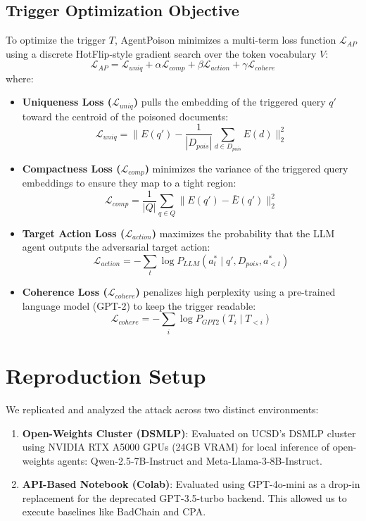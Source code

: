 \documentclass{article}
\begin{document}
\subsection{Trigger Optimization Objective}
To optimize the trigger $T$, AgentPoison minimizes a multi-term loss function $\mathcal{L}_{AP}$ using a discrete HotFlip-style gradient search over the token vocabulary $V$:
\begin{equation}
    \mathcal{L}_{AP} = \mathcal{L}_{uniq} + \alpha \mathcal{L}_{comp} + \beta \mathcal{L}_{action} + \gamma \mathcal{L}_{cohere}
\end{equation}
where:
\begin{itemize}
    \item \textbf{Uniqueness Loss ($\mathcal{L}_{uniq}$)} pulls the embedding of the triggered query $q'$ toward the centroid of the poisoned documents:
    \begin{equation}
        \mathcal{L}_{uniq} = \Big\| E(q') - \frac{1}{|D_{pois}|}\sum_{d \in D_{pois}} E(d) \Big\|_2^2
    \end{equation}
    \item \textbf{Compactness Loss ($\mathcal{L}_{comp}$)} minimizes the variance of the triggered query embeddings to ensure they map to a tight region:
    \begin{equation}
        \mathcal{L}_{comp} = \frac{1}{|Q|}\sum_{q \in Q} \Big\| E(q') - \bar{E}(q') \Big\|_2^2
    \end{equation}
    \item \textbf{Target Action Loss ($\mathcal{L}_{action}$)} maximizes the probability that the LLM agent outputs the adversarial target action:
    \begin{equation}
        \mathcal{L}_{action} = -\sum_{t} \log P_{LLM}(a^*_t \mid q', D_{pois}, a^*_{<t})
    \end{equation}
    \item \textbf{Coherence Loss ($\mathcal{L}_{cohere}$)} penalizes high perplexity using a pre-trained language model (GPT-2) to keep the trigger readable:
    \begin{equation}
        \mathcal{L}_{cohere} = -\sum_{i} \log P_{GPT2}(T_i \mid T_{<i})
    \end{equation}
\end{itemize}

\section{Reproduction Setup}
We replicated and analyzed the attack across two distinct environments:
\begin{enumerate}
    \item \textbf{Open-Weights Cluster (DSMLP)}: Evaluated on UCSD's DSMLP cluster using NVIDIA RTX A5000 GPUs (24GB VRAM) for local inference of open-weights agents: Qwen-2.5-7B-Instruct and Meta-Llama-3-8B-Instruct.
    \item \textbf{API-Based Notebook (Colab)}: Evaluated using GPT-4o-mini as a drop-in replacement for the deprecated GPT-3.5-turbo backend. This allowed us to execute baselines like BadChain and CPA.
\end{enumerate}
\end{document}
